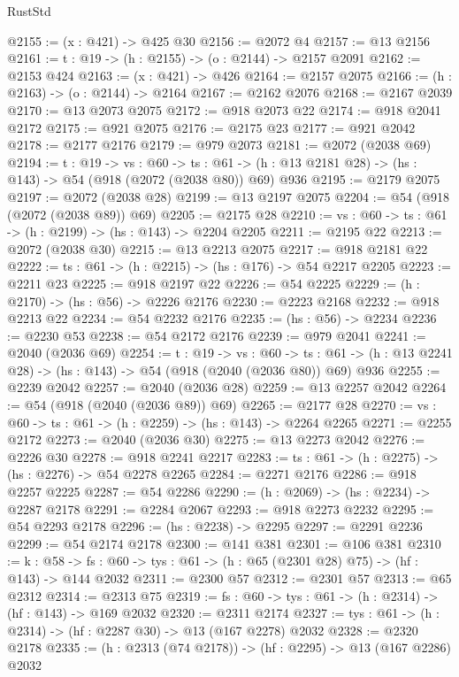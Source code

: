 \begin{lexlean}{RustStd}
\begin{coremodule}
@2155 := (x : @421) -> @425 @30
@2156 := @2072 @4
@2157 := @13 @2156
@2161 := {t : @19} -> (h : @2155) -> (o : @2144) -> @2157 @2091
@2162 := @2153 @424
@2163 := (x : @421) -> @426
@2164 := @2157 @2075
@2166 := (h : @2163) -> (o : @2144) -> @2164
@2167 := @2162 @2076
@2168 := @2167 @2039
@2170 := @13 @2073 @2075
@2172 := @918 @2073 @22
@2174 := @918 @2041 @2172
@2175 := @921 @2075
@2176 := @2175 @23
@2177 := @921 @2042
@2178 := @2177 @2176
@2179 := @979 @2073
@2181 := @2072 (@2038 @69)
@2194 := {t : @19} ->
  {vs : @60} ->
  {ts : @61} -> (h : @13 @2181 @28) -> (hs : @143) -> @54 (@918 (@2072 (@2038 @80)) @69) @936
@2195 := @2179 @2075
@2197 := @2072 (@2038 @28)
@2199 := @13 @2197 @2075
@2204 := @54 (@918 (@2072 (@2038 @89)) @69)
@2205 := @2175 @28
@2210 := {vs : @60} -> {ts : @61} -> (h : @2199) -> (hs : @143) -> @2204 @2205
@2211 := @2195 @22
@2213 := @2072 (@2038 @30)
@2215 := @13 @2213 @2075
@2217 := @918 @2181 @22
@2222 := {ts : @61} -> (h : @2215) -> (hs : @176) -> @54 @2217 @2205
@2223 := @2211 @23
@2225 := @918 @2197 @22
@2226 := @54 @2225
@2229 := (h : @2170) -> (hs : @56) -> @2226 @2176
@2230 := @2223 @2168
@2232 := @918 @2213 @22
@2234 := @54 @2232 @2176
@2235 := (hs : @56) -> @2234
@2236 := @2230 @53
@2238 := @54 @2172 @2176
@2239 := @979 @2041
@2241 := @2040 (@2036 @69)
@2254 := {t : @19} ->
  {vs : @60} ->
  {ts : @61} -> (h : @13 @2241 @28) -> (hs : @143) -> @54 (@918 (@2040 (@2036 @80)) @69) @936
@2255 := @2239 @2042
@2257 := @2040 (@2036 @28)
@2259 := @13 @2257 @2042
@2264 := @54 (@918 (@2040 (@2036 @89)) @69)
@2265 := @2177 @28
@2270 := {vs : @60} -> {ts : @61} -> (h : @2259) -> (hs : @143) -> @2264 @2265
@2271 := @2255 @2172
@2273 := @2040 (@2036 @30)
@2275 := @13 @2273 @2042
@2276 := @2226 @30
@2278 := @918 @2241 @2217
@2283 := {ts : @61} -> (h : @2275) -> (hs : @2276) -> @54 @2278 @2265
@2284 := @2271 @2176
@2286 := @918 @2257 @2225
@2287 := @54 @2286
@2290 := (h : @2069) -> (hs : @2234) -> @2287 @2178
@2291 := @2284 @2067
@2293 := @918 @2273 @2232
@2295 := @54 @2293 @2178
@2296 := (hs : @2238) -> @2295
@2297 := @2291 @2236
@2299 := @54 @2174 @2178
@2300 := @141 @381
@2301 := @106 @381
@2310 := {k : @58} ->
  {fs : @60} -> {tys : @61} -> (h : @65 (@2301 @28) @75) -> (hf : @143) -> @144 @2032
@2311 := @2300 @57
@2312 := @2301 @57
@2313 := @65 @2312
@2314 := @2313 @75
@2319 := {fs : @60} -> {tys : @61} -> (h : @2314) -> (hf : @143) -> @169 @2032
@2320 := @2311 @2174
@2327 := {tys : @61} -> (h : @2314) -> (hf : @2287 @30) -> @13 (@167 @2278) @2032
@2328 := @2320 @2178
@2335 := (h : @2313 (@74 @2178)) -> (hf : @2295) -> @13 (@167 @2286) @2032

\end{coremodule}
\end{lexlean}
